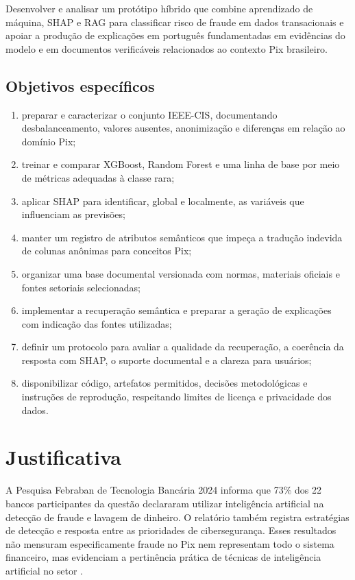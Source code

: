 Desenvolver e analisar um protótipo híbrido que combine aprendizado de máquina, SHAP e RAG para classificar risco de fraude em dados transacionais e apoiar a produção de explicações em português fundamentadas em evidências do modelo e em documentos verificáveis relacionados ao contexto Pix brasileiro.

\subsection{Objetivos específicos}

\begin{enumerate}
  \item preparar e caracterizar o conjunto IEEE-CIS, documentando desbalanceamento, valores ausentes, anonimização e diferenças em relação ao domínio Pix;
  \item treinar e comparar XGBoost, Random Forest e uma linha de base por meio de métricas adequadas à classe rara;
  \item aplicar SHAP para identificar, global e localmente, as variáveis que influenciam as previsões;
  \item manter um registro de atributos semânticos que impeça a tradução indevida de colunas anônimas para conceitos Pix;
  \item organizar uma base documental versionada com normas, materiais oficiais e fontes setoriais selecionadas;
  \item implementar a recuperação semântica e preparar a geração de explicações com indicação das fontes utilizadas;
  \item definir um protocolo para avaliar a qualidade da recuperação, a coerência da resposta com SHAP, o suporte documental e a clareza para usuários;
  \item disponibilizar código, artefatos permitidos, decisões metodológicas e instruções de reprodução, respeitando limites de licença e privacidade dos dados.
\end{enumerate}

\section{Justificativa}

A Pesquisa Febraban de Tecnologia Bancária 2024 informa que 73\% dos 22 bancos participantes da questão declararam utilizar inteligência artificial na detecção de fraude e lavagem de dinheiro. O relatório também registra estratégias de detecção e resposta entre as prioridades de cibersegurança. Esses resultados não mensuram especificamente fraude no Pix nem representam todo o sistema financeiro, mas evidenciam a pertinência prática de técnicas de inteligência artificial no setor \cite{febraban2024}.

